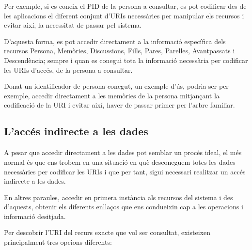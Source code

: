         Per exemple, si es coneix el PID de la persona a consultar, es pot codificar des de les aplicacions el diferent conjunt d'URIs necessàries per manipular els recursos i evitar així, la necessitat de passar pel sistema.

        D'aquesta forma, es pot accedir directament a la informació específica dels recur\-sos Persona, Memòries, Discussions, Fills, Pares, Parelles, Avantpassats i Descen\-dència; sempre i quan es conegui tota la informació necessària per codificar les URIs d'accés, de la persona a consultar.

        Donat un identificador de persona conegut, un exemple d'ús, podria ser per exemple, accedir directament a les memòries de la persona mitjançant la codificació de la URI i evitar així, haver de passar primer per l'arbre familiar.


    \subsection{L'accés indirecte a les dades}

        \paragraph{}
        A pesar que accedir directament a les dades pot semblar un procés ideal, el més normal és que ens trobem en una situació en què desconeguem totes les dades necessàries per codificar les URIs i que per tant, sigui necessari realitzar un accés indirecte a les dades.

        En altres paraules, accedir en primera instància als recursos del sistema i des d'aquests, obtenir els diferents enllaços que ens condueixin cap a les operacions i informació desitjada.

        Per descobrir l’URI del recurs exacte que vol ser consultat, existeixen principalment tres opcions diferents:

